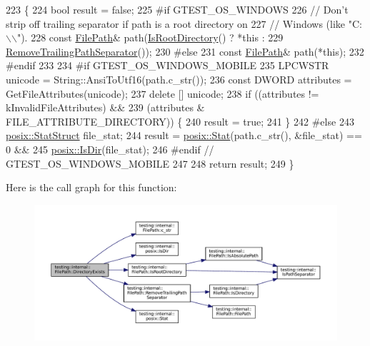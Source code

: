 \begin{DoxyCode}
223                                      \{
224   \textcolor{keywordtype}{bool} result = \textcolor{keyword}{false};
225 \textcolor{preprocessor}{#if GTEST\_OS\_WINDOWS}
226   \textcolor{comment}{// Don't strip off trailing separator if path is a root directory on}
227   \textcolor{comment}{// Windows (like "C:\(\backslash\)\(\backslash\)").}
228   \textcolor{keyword}{const} \hyperlink{classtesting_1_1internal_1_1FilePath_a3504a51accbca78a52fe586133ea5499}{FilePath}& path(\hyperlink{classtesting_1_1internal_1_1FilePath_a0661adf59aec40c40c8e39b888d68142}{IsRootDirectory}() ? *\textcolor{keyword}{this} :
229                                            \hyperlink{classtesting_1_1internal_1_1FilePath_ab47ada111cc940cf2359f6533bada6ca}{RemoveTrailingPathSeparator}());
230 \textcolor{preprocessor}{#else}
231   \textcolor{keyword}{const} \hyperlink{classtesting_1_1internal_1_1FilePath_a3504a51accbca78a52fe586133ea5499}{FilePath}& path(*\textcolor{keyword}{this});
232 \textcolor{preprocessor}{#endif}
233 
234 \textcolor{preprocessor}{#if GTEST\_OS\_WINDOWS\_MOBILE}
235   LPCWSTR unicode = String::AnsiToUtf16(path.c\_str());
236   \textcolor{keyword}{const} DWORD attributes = GetFileAttributes(unicode);
237   \textcolor{keyword}{delete} [] unicode;
238   \textcolor{keywordflow}{if} ((attributes != kInvalidFileAttributes) &&
239       (attributes & FILE\_ATTRIBUTE\_DIRECTORY)) \{
240     result = \textcolor{keyword}{true};
241   \}
242 \textcolor{preprocessor}{#else}
243   \hyperlink{namespacetesting_1_1internal_1_1posix_a8eb9f08d3af29941c2d2a964cfff3ecb}{posix::StatStruct} file\_stat;
244   result = \hyperlink{namespacetesting_1_1internal_1_1posix_a2b87b7ff647a128614daf50667eb9304}{posix::Stat}(path.c\_str(), &file\_stat) == 0 &&
245       \hyperlink{namespacetesting_1_1internal_1_1posix_af0d04ed5baeed28353fa38742748a421}{posix::IsDir}(file\_stat);
246 \textcolor{preprocessor}{#endif  // GTEST\_OS\_WINDOWS\_MOBILE}
247 
248   \textcolor{keywordflow}{return} result;
249 \}
\end{DoxyCode}
Here is the call graph for this function\+:
\nopagebreak
\begin{figure}[H]
\begin{center}
\leavevmode
\includegraphics[width=350pt]{classtesting_1_1internal_1_1FilePath_a74ba8435e822d77f79f137c38de9bfeb_cgraph}
\end{center}
\end{figure}
